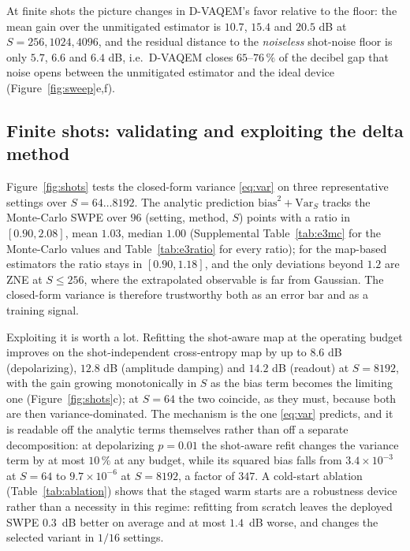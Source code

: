 \documentclass[ASNA,twocolumn]{USG}
\newcommand{\dvaqem}{D-VAQEM}
\begin{document}
At finite shots the picture changes in \dvaqem{}'s favor relative to the
floor: the mean gain over the unmitigated estimator is $10.7$, $15.4$ and
$20.5$ dB at $S=256,1024,4096$, and the residual distance to the
\emph{noiseless} shot-noise floor is only $5.7$, $6.6$ and $6.4$ dB, i.e.\
\dvaqem{} closes $65$--$76\,\%$ of the decibel gap that noise opens between the
unmitigated estimator and the ideal device (Figure~\ref{fig:sweep}e,f).

\subsection{Finite shots: validating and exploiting the delta method}
\label{subsec:shots}

Figure~\ref{fig:shots} tests the closed-form variance \eqref{eq:var} on three
representative settings over $S=64\dots8192$.  The analytic prediction
$\mathrm{bias}^2+\mathrm{Var}_S$ tracks the Monte-Carlo SWPE over
$96$ (setting, method, $S$) points with a ratio in $[0.90,2.08]$, mean $1.03$,
median $1.00$ (Supplemental Table~\ref{tab:e3mc} for the Monte-Carlo values
and Table~\ref{tab:e3ratio} for every ratio); for the map-based estimators the ratio
stays in
$[0.90,1.18]$, and the only deviations beyond $1.2$ are ZNE at $S\le256$,
where the extrapolated observable is far from Gaussian.  The closed-form
variance is therefore trustworthy both as an error bar and as a training
signal.

Exploiting it is worth a lot.  Refitting the shot-aware map at the operating
budget improves on the shot-independent cross-entropy map by up to $8.6$ dB
(depolarizing), $12.8$ dB (amplitude damping) and $14.2$ dB (readout) at
$S=8192$, with the gain growing monotonically in $S$ as the bias term becomes
the limiting one (Figure~\ref{fig:shots}c); at $S=64$ the two coincide, as they
must, because both are then variance-dominated.  The mechanism is the one
\eqref{eq:var} predicts, and it is readable off the analytic terms themselves
rather than off a separate decomposition: at depolarizing $p=0.01$ the shot-aware
refit changes the variance term by at most $10\,\%$ at any budget, while its
squared bias falls from $3.4\times10^{-3}$ at $S=64$ to $9.7\times10^{-6}$ at
$S=8192$, a factor of $347$.  A cold-start ablation (Table~\ref{tab:ablation})
shows that the staged warm starts are a robustness device rather than a necessity
in this regime: refitting from scratch leaves the deployed SWPE $0.3$~dB better on
average and at most $1.4$~dB worse, and changes the selected variant in $1/16$
settings.
\end{document}
